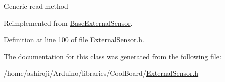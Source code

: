 Generic read method 

Reimplemented from \hyperlink{class_base_external_sensor_a7e0a98f350148d7645031315657aa5ec}{Base\+External\+Sensor}.



Definition at line 100 of file External\+Sensor.\+h.



The documentation for this class was generated from the following file\+:\begin{DoxyCompactItemize}
\item 
/home/ashiroji/\+Arduino/libraries/\+Cool\+Board/\hyperlink{_external_sensor_8h}{External\+Sensor.\+h}\end{DoxyCompactItemize}
